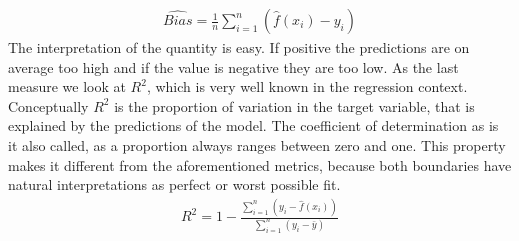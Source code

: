 \begin{align}
\hat{Bias}=\frac{1}{n}\sum_{i=1}^n(\hat{f}(x_i)-y_i)
\end{align}
The interpretation of the quantity is easy. If positive the predictions are on average too high and if the value is negative they are too low. As the last measure we look at $R^2$, which is very well known in the regression context. Conceptually $R^2$ is the proportion of variation in the target variable, that is explained by the predictions of the model. The coefficient of determination as is it also called, as a proportion always ranges between zero and one. This property makes it different from the aforementioned metrics, because both boundaries have natural interpretations as perfect or worst possible fit.
\begin{align}
R^2=1-\frac{\sum_{i=1}^n(y_i-\hat{f}(x_i))}{\sum_{i=1}^n(y_i-\bar{y})}
\end{align}  